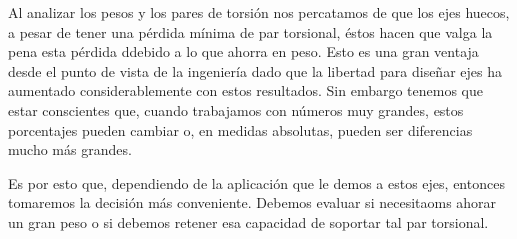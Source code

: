 \documentclass[12pt, letterpaper]{article}
\begin{document}
Al analizar los pesos y los pares de torsión nos percatamos de que los ejes huecos, a pesar de tener una pérdida mínima de par torsional, éstos hacen que valga la pena esta pérdida ddebido a lo que ahorra en peso. Esto es una gran ventaja desde el punto de vista de la ingeniería dado que la libertad para diseñar ejes ha aumentado considerablemente con estos resultados. Sin embargo tenemos que estar conscientes que, cuando trabajamos con números muy grandes, estos porcentajes pueden cambiar o, en medidas absolutas, pueden ser diferencias mucho más grandes.

Es por esto que, dependiendo de la aplicación que le demos a estos ejes, entonces tomaremos la decisión más conveniente. Debemos evaluar si necesitaoms ahorar un gran peso o si debemos retener esa capacidad de soportar tal par torsional.
\renewcommand\refname{Referencias}
\printbibliography
\end{document}
